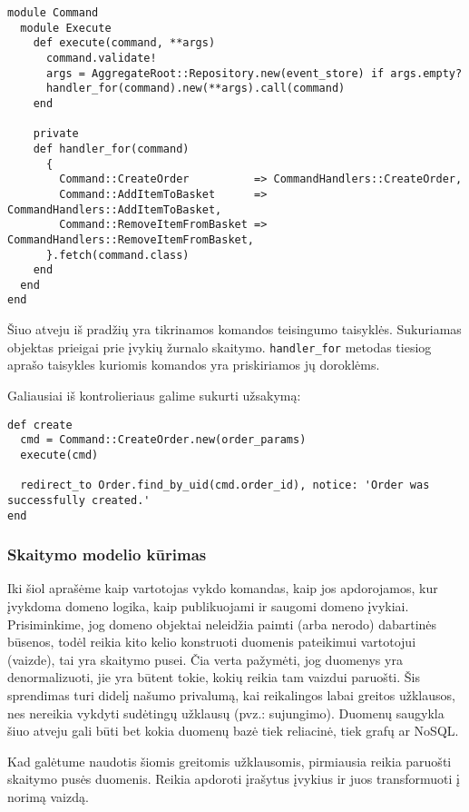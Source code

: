 \begin{lstlisting}
module Command
  module Execute
    def execute(command, **args)
      command.validate!
      args = AggregateRoot::Repository.new(event_store) if args.empty?
      handler_for(command).new(**args).call(command)
    end

    private
    def handler_for(command)
      {
        Command::CreateOrder          => CommandHandlers::CreateOrder,
        Command::AddItemToBasket      => CommandHandlers::AddItemToBasket,
        Command::RemoveItemFromBasket => CommandHandlers::RemoveItemFromBasket,
      }.fetch(command.class)
    end
  end
end
\end{lstlisting}

Šiuo atveju iš pradžių yra tikrinamos komandos teisingumo taisyklės. Sukuriamas objektas prieigai prie įvykių žurnalo skaitymo. \lstinline|handler_for| metodas tiesiog aprašo taisykles kuriomis komandos yra priskiriamos jų doroklėms.

Galiausiai iš kontrolieriaus galime sukurti užsakymą:

\begin{lstlisting}
def create
  cmd = Command::CreateOrder.new(order_params)
  execute(cmd)

  redirect_to Order.find_by_uid(cmd.order_id), notice: 'Order was successfully created.'
end
\end{lstlisting}

\subsubsection{Skaitymo modelio kūrimas}

Iki šiol aprašėme kaip vartotojas vykdo komandas, kaip jos apdorojamos, kur įvykdoma domeno logika, kaip publikuojami ir saugomi domeno įvykiai. Prisiminkime, jog domeno objektai neleidžia paimti (arba nerodo) dabartinės būsenos, todėl reikia kito kelio konstruoti duomenis pateikimui vartotojui (vaizde), tai yra skaitymo pusei. Čia verta pažymėti, jog duomenys yra denormalizuoti, jie yra būtent tokie, kokių reikia tam vaizdui paruošti. Šis sprendimas turi didelį našumo privalumą, kai reikalingos labai greitos užklausos, nes nereikia vykdyti sudėtingų užklausų (pvz.: sujungimo). Duomenų saugykla šiuo atveju gali būti bet kokia duomenų bazė tiek reliacinė, tiek grafų ar NoSQL.

Kad galėtume naudotis šiomis greitomis užklausomis, pirmiausia reikia paruošti skaitymo pusės duomenis. Reikia apdoroti įrašytus įvykius ir juos transformuoti į norimą vaizdą.

